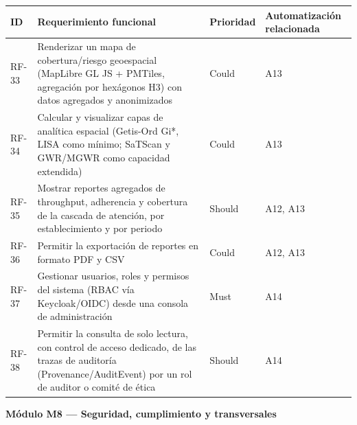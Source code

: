 \documentclass[11pt,a4paper]{article}
\begin{document}
{\small
\begin{longtable}[]{@{}
  >{\raggedright\arraybackslash}p{}
  >{\raggedright\arraybackslash}p{}
  >{\raggedright\arraybackslash}p{}
  >{\raggedright\arraybackslash}p{}@{}}
\toprule\noalign{}
\begin{minipage}[b]{\linewidth}\raggedright
ID
\end{minipage} & \begin{minipage}[b]{\linewidth}\raggedright
Requerimiento funcional
\end{minipage} & \begin{minipage}[b]{\linewidth}\raggedright
Prioridad
\end{minipage} & \begin{minipage}[b]{\linewidth}\raggedright
Automatización relacionada
\end{minipage} \\
\midrule\noalign{}
\endhead
\bottomrule\noalign{}
\endlastfoot
RF-33 & Renderizar un mapa de cobertura/riesgo geoespacial (MapLibre GL JS + PMTiles, agregación por hexágonos H3) con datos agregados y anonimizados & Could & A13 \\
RF-34 & Calcular y visualizar capas de analítica espacial (Getis-Ord Gi*, LISA como mínimo; SaTScan y GWR/MGWR como capacidad extendida) & Could & A13 \\
RF-35 & Mostrar reportes agregados de throughput, adherencia y cobertura de la cascada de atención, por establecimiento y por periodo & Should & A12, A13 \\
RF-36 & Permitir la exportación de reportes en formato PDF y CSV & Could & A12, A13 \\
RF-37 & Gestionar usuarios, roles y permisos del sistema (RBAC vía Keycloak/OIDC) desde una consola de administración & Must & A14 \\
RF-38 & Permitir la consulta de solo lectura, con control de acceso dedicado, de las trazas de auditoría (Provenance/AuditEvent) por un rol de auditor o comité de ética & Should & A14 \\
\end{longtable}
}

\textbf{Módulo M8 --- Seguridad, cumplimiento y transversales}
\end{document}
